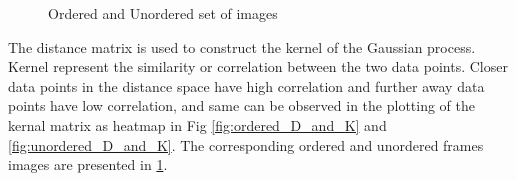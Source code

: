 	\begin{figure}[h]
		\centering
		\qquad
		\caption{Ordered and Unordered set of images}%
		\label{fig:ordered_and_unordered_images}%
	\end{figure}
	
	The distance matrix is used to construct the kernel of the Gaussian process. Kernel represent the similarity or correlation between the two data points. Closer data points in the distance space have high correlation and further away data points have low correlation, and same can be observed in the plotting of the kernal matrix as heatmap in Fig \ref{fig:ordered_D_and_K} and \ref{fig:unordered_D_and_K}. The corresponding ordered and unordered frames images are presented in \ref{fig:ordered_and_unordered_images}.  
	
